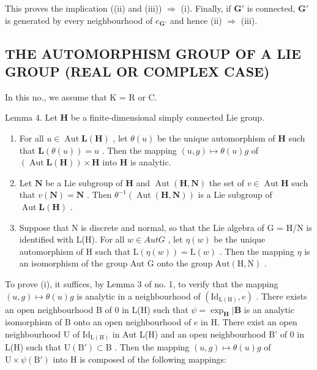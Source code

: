 This proves the implication ((ii) and (iii)) \(\Rightarrow\) (i). Finally, if \(\mathbf{G}'\) is connected, \(\mathbf{G}'\) is generated by every neighbourhood of \(e_{\mathbf{G}'}\) and hence (ii) \(\Rightarrow\) (iii).

\subsection{THE AUTOMORPHISM GROUP OF A LIE GROUP (REAL OR COMPLEX CASE)}

In this no., we assume that K = R or C.

Lemma 4. Let \(\mathbf{H}\) be a finite-dimensional simply connected Lie group.

\begin{enumerate}
\def\labelenumi{(\roman{enumi})}
\item
  For all \(u \in \operatorname{Aut} \mathbf{L}(\mathbf{H})\) , let \(\theta(u)\) be the unique automorphism of \(\mathbf{H}\) such that \(\mathbf{L}(\theta(u)) = u\) . Then the mapping \((u, g) \mapsto \theta(u)g\) of \((\operatorname{Aut} \mathbf{L}(\mathbf{H})) \times \mathbf{H}\) into \(\mathbf{H}\) is analytic.
\item
  Let \(\mathbf{N}\) be a Lie subgroup of \(\mathbf{H}\) and \(\operatorname{Aut}(\mathbf{H},\mathbf{N})\) the set of \(v\in \operatorname{Aut}\mathbf{H}\) such that \(v(\mathbf{N}) = \mathbf{N}\) . Then \(\theta^{-1}(\operatorname {Aut}(\mathbf{H},\mathbf{N}))\) is a Lie subgroup of \(\operatorname {Aut}\mathbf{L}(\mathbf{H})\) .
\item
  Suppose that N is discrete and normal, so that the Lie algebra of G = H/N is identified with L(H). For all \(w \in Aut G\) , let \(\eta(w)\) be the unique automorphism of H such that \(\mathrm{L}(\eta(w)) = \mathrm{L}(w)\) . Then the mapping \(\eta\) is an isomorphism of the group Aut G onto the group \(\mathrm{Aut}(\mathrm{H}, \mathrm{N})\) .
\end{enumerate}

To prove (i), it suffices, by Lemma 3 of no. 1, to verify that the mapping \((u,g)\mapsto\theta(u)g\) is analytic in a neighbourhood of \((\mathrm{Id}_{\mathrm{L(H)}},e)\) . There exists an open neighbourhood B of 0 in L(H) such that \(\psi = \exp_{\mathbf{H}}|\mathbf{B}\) is an analytic isomorphism of B onto an open neighbourhood of \(e\) in H. There exist an open neighbourhood U of \(\mathrm{Id}_{\mathrm{L(H)}}\) in Aut L(H) and an open neighbourhood B' of 0 in L(H) such that \(\mathrm{U(B')} \subset \mathrm{B}\) . Then the mapping \((u, g) \mapsto \theta(u)g\) of \(\mathrm{U} \times \psi(\mathrm{B'})\) into H is composed of the following mappings:

